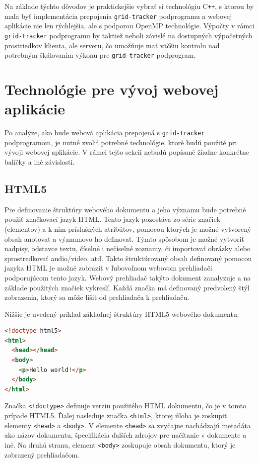 Na základe týchto dôvodov je praktickejšie vybrať si technológiu C\texttt{++}, s ktorou by mala byť implementácia prepojenia \texttt{grid-tracker} podprogramu a webovej aplikácie nie len rýchlejšia, ale s podporou OpenMP technológie. Výpočty v rámci \texttt{grid-tracker} podprogramu by taktiež neboli závislé na dostupných výpočetných prostriedkov klienta, ale serveru, čo umožňuje mať väčšiu kontrolu nad potrebným škálovaním výkonu pre \texttt{grid-tracker} podprogram. 

\section {Technológie pre vývoj webovej aplikácie}
Po analýze, ako bude webová aplikácia prepojená s \texttt{grid-tracker} podprogramom, je nutné zvoliť potrebné technológie, ktoré budú použité pri vývoji webovej aplikácie. V rámci tejto sekcii nebudú popísané žiadne konkrétne balíčky a iné závislosti.

\subsection {HTML5}
Pre definovanie štruktúry webového dokumentu a jeho významu bude potrebné použiť značkovací jazyk HTML. Tento jazyk pozostáva zo série značiek (elementov) a k nim príslušných atribútov, pomocou ktorých je možné vytvorený obsah anotovať a významovo ho definovať. Týmto spôsobom je možné vytvoriť nadpisy, odstavce textu, číselné i nečíselné zoznamy, či importovať obrázky alebo sprostredkovať audio/video, atď. Takto štruktúrovaný obsah definovaný pomocou jazyka HTML je možné zobraziť v ľubovoľnom webovom prehliadači podporujúcom tento jazyk. Webový prehliadač takýto dokument zanalyzuje a na základe použitých značiek vykreslí. Každá značka má definovaný predvolený štýl zobrazenia, ktorý sa môže líšiť od prehliadača k prehliadaču.

Nižšie je uvedený príklad základnej štruktúry HTML5 webového dokumentu:
\begin{lstlisting}[language=HTML]
<!doctype html5>
<html>
  <head></head>
  <body>
    <p>Hello world!</p>
  </body>
</html>
\end{lstlisting}

Značka \texttt{<!doctype>} definuje verziu použitého HTML dokumentu, čo je v tomto prípade HTML5. Ďalej nasleduje značka \texttt{<html>}, ktorej úloha je zoskupiť elementy \texttt{<head>} a \texttt{<body>}. V elemente \texttt{<head>} sa zvyčajne nachádzajú metadáta ako názov dokumentu, špecifikácia ďalších zdrojov pre načítanie v dokumente a iné. Na druhú stranu, element \texttt{<body>} zoskupuje obsah dokumentu, ktorý je zobrazený prehliadačom.

